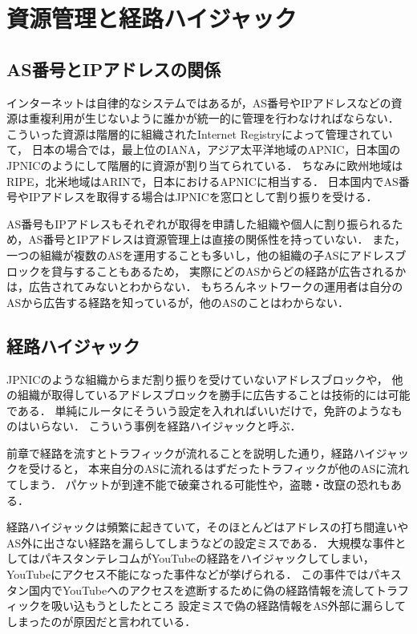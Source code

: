 \section{資源管理と経路ハイジャック}

\subsection{AS番号とIPアドレスの関係}

インターネットは自律的なシステムではあるが，AS番号やIPアドレスなどの資源は重複利用が生じないように誰かが統一的に管理を行わなければならない．
こういった資源は階層的に組織されたInternet Registryによって管理されていて，
日本の場合では，最上位のIANA，アジア太平洋地域のAPNIC，日本国のJPNICのようにして階層的に資源が割り当てられている．
ちなみに欧州地域はRIPE，北米地域はARINで，日本におけるAPNICに相当する．
日本国内でAS番号やIPアドレスを取得する場合はJPNICを窓口として割り振りを受ける．

AS番号もIPアドレスもそれぞれが取得を申請した組織や個人に割り振られるため，AS番号とIPアドレスは資源管理上は直接の関係性を持っていない．
また，一つの組織が複数のASを運用することも多いし，他の組織の子ASにアドレスブロックを貸与することもあるため，
実際にどのASからどの経路が広告されるかは，広告されてみないとわからない．
もちろんネットワークの運用者は自分のASから広告する経路を知っているが，他のASのことはわからない．

\subsection{経路ハイジャック}

JPNICのような組織からまだ割り振りを受けていないアドレスブロックや，
他の組織が取得しているアドレスブロックを勝手に広告することは技術的には可能である．
単純にルータにそういう設定を入れればいいだけで，免許のようなものはいらない．
こういう事例を経路ハイジャックと呼ぶ．

前章で経路を流すとトラフィックが流れることを説明した通り，経路ハイジャックを受けると，
本来自分のASに流れるはずだったトラフィックが他のASに流れてしまう．
パケットが到達不能で破棄される可能性や，盗聴・改竄の恐れもある．

経路ハイジャックは頻繁に起きていて，そのほとんどはアドレスの打ち間違いやAS外に出さない経路を漏らしてしまうなどの設定ミスである．
大規模な事件としてはパキスタンテレコムがYouTubeの経路をハイジャックしてしまい，YouTubeにアクセス不能になった事件などが挙げられる．
この事件ではパキスタン国内でYouTubeへのアクセスを遮断するために偽の経路情報を流してトラフィックを吸い込もうとしたところ
設定ミスで偽の経路情報をAS外部に漏らしてしまったのが原因だと言われている．

